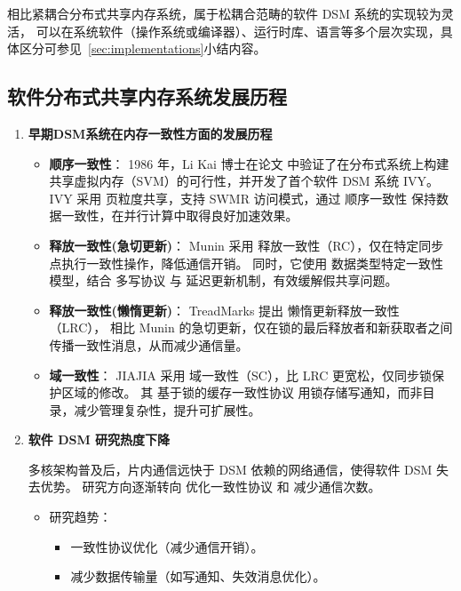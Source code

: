{  相比紧耦合分布式共享内存系统，属于松耦合范畴的软件 DSM 系统的实现较为灵活，
  可以在系统软件（操作系统或编译器）、运行时库、语言等多个层次实现，具体区分可参见~\ref{sec:implementations}小结内容。


  \subsection{软件分布式共享内存系统发展历程}
  \begin{enumerate}[leftmargin=1em, align=left]
    \item \textbf{早期DSM系统在内存一致性方面的发展历程}

          \begin{itemize}
            \item \textbf{顺序一致性}： 1986 年，Li Kai 博士在论文\citep{likai1986svm} 中验证了在分布式系统上构建共享虚拟内存（SVM）的可行性，并开发了首个软件 DSM 系统 IVY\citep{likai1988ivy}。
                  IVY 采用 页粒度共享，支持 SWMR 访问模式，通过 顺序一致性 保持数据一致性，在并行计算中取得良好加速效果。
            \item \textbf{释放一致性(急切更新)}： Munin\citep{bennett1990munin} 采用 释放一致性（RC），仅在特定同步点执行一致性操作，降低通信开销。
                  同时，它使用 数据类型特定一致性模型，结合 多写协议 与 延迟更新机制，有效缓解假共享问题。
            \item \textbf{释放一致性(懒惰更新)}： TreadMarks\citep{amza1996treadmarks} 提出 懒惰更新释放一致性（LRC），
                  相比 Munin 的急切更新，仅在锁的最后释放者和新获取者之间传播一致性消息，从而减少通信量。
            \item \textbf{域一致性}： JIAJIA\citep{huweiwu2001sma} 采用 域一致性（SC），比 LRC 更宽松，仅同步锁保护区域的修改。
                  其 基于锁的缓存一致性协议 用锁存储写通知，而非目录，减少管理复杂性，提升可扩展性。
          \end{itemize}

    \item \textbf{软件 DSM 研究热度下降}

          多核架构普及后，片内通信远快于 DSM 依赖的网络通信，使得软件 DSM 失去优势。
          研究方向逐渐转向 优化一致性协议 和 减少通信次数\citep{Cheung1999AMP, abe2003movinghomedsm}。
          \begin{itemize}
            \item 研究趋势：
                  \begin{itemize}
                    \item 一致性协议优化（减少通信开销）。
                    \item 减少数据传输量（如写通知、失效消息优化）。
                  \end{itemize}
          \end{itemize}


\end{enumerate}}
